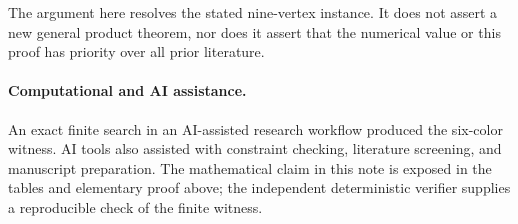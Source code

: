 \documentclass[11pt]{article}
\begin{document}
The argument here resolves the stated nine-vertex instance.  It does not
assert a new general product theorem, nor does it assert that the numerical
value or this proof has priority over all prior literature.

\paragraph{Computational and AI assistance.}
An exact finite search in an AI-assisted research workflow produced the
six-color witness.  AI tools also assisted with constraint checking,
literature screening, and manuscript preparation.  The mathematical claim in
this note is exposed in the tables and elementary proof above; the independent
deterministic verifier supplies a reproducible check of the finite witness.



\end{document}
